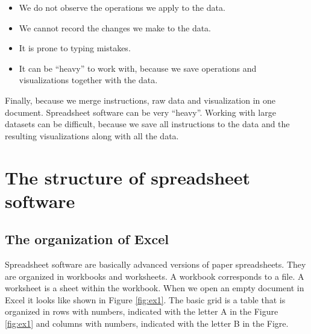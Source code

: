 \documentclass[]{book}
\providecommand{\tightlist}{%
  \setlength{\itemsep}{0pt}\setlength{\parskip}{0pt}}
\begin{document}
\begin{itemize}
\tightlist
\item
  We do not observe the operations we apply to the data.
\item
  We cannot record the changes we make to the data.
\item
  It is prone to typing mistakes.
\item
  It can be ``heavy'' to work with, because we save operations and visualizations together with the data.
\end{itemize}

Finally, because we merge instructions, raw data and visualization in one document. Spreadsheet software can be very ``heavy''. Working with large datasets can be difficult, because we save all instructions to the data and the resulting visualizations along with all the data.

\hypertarget{the-structure-of-spreadsheet-software}{%
\section{The structure of spreadsheet software}\label{the-structure-of-spreadsheet-software}}

\hypertarget{the-organization-of-excel}{%
\subsection{The organization of Excel}\label{the-organization-of-excel}}

Spreadsheet software are basically advanced versions of paper spreadsheets. They are organized in workbooks and worksheets. A workbook corresponds to a file. A worksheet is a sheet within the workbook. When we open an empty document in Excel it looks like shown in Figure \ref{fig:ex1}. The basic grid is a table that is organized in rows with numbers, indicated with the letter A in the Figure \ref{fig:ex1} and columns with numbers, indicated with the letter B in the Figre.
\end{document}

